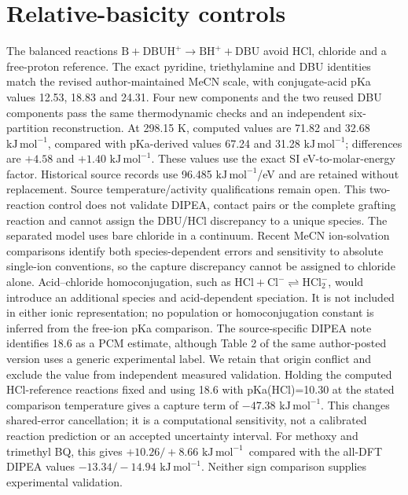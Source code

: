 \documentclass[11pt]{article}
\newcommand{\kj}{\ensuremath{\mathrm{kJ\,mol^{-1}}}}
\begin{document}
\section{Relative-basicity controls}
The balanced reactions $\mathrm{B+DBUH^+\rightarrow BH^++DBU}$ avoid HCl, chloride and a free-proton reference. The exact pyridine, triethylamine and DBU identities match the revised author-maintained MeCN scale, with conjugate-acid pKa values 12.53, 18.83 and 24.31.\cite{basicity2019,pkaTables} Four new components and the two reused DBU components pass the same thermodynamic checks and an independent six-partition reconstruction. At 298.15 K, computed values are 71.82 and 32.68 \kj, compared with pKa-derived values 67.24 and 31.28 \kj; differences are $+4.58$ and $+1.40$ \kj. These values use the exact SI eV-to-molar-energy factor. Historical source records use 96.485 \kj/eV and are retained without replacement. Source temperature/activity qualifications remain open. This two-reaction control does not validate DIPEA, contact pairs or the complete grafting reaction and cannot assign the DBU/HCl discrepancy to a unique species. The separated model uses bare chloride in a continuum. Recent MeCN ion-solvation comparisons identify both species-dependent errors and sensitivity to absolute single-ion conventions, so the capture discrepancy cannot be assigned to chloride alone.\cite{pliego2024} Acid--chloride homoconjugation, such as $\mathrm{HCl+Cl^-\rightleftharpoons HCl_2^-}$, would introduce an additional species and acid-dependent speciation. It is not included in either ionic representation; no population or homoconjugation constant is inferred from the free-ion pKa comparison.
The source-specific DIPEA note identifies 18.6 as a PCM estimate, although Table 2 of the same author-posted version uses a generic experimental label.\cite{heldebrant2011} We retain that origin conflict and exclude the value from independent measured validation. Holding the computed HCl-reference reactions fixed and using 18.6 with pKa(HCl)=10.30 at the stated comparison temperature gives a capture term of $-47.38$ \kj. This changes shared-error cancellation; it is a computational sensitivity, not a calibrated reaction prediction or an accepted uncertainty interval.
For methoxy and trimethyl BQ, this gives $+10.26/+8.66$ \kj\ compared with the all-DFT DIPEA values $-13.34/-14.94$ \kj. Neither sign comparison supplies experimental validation.
\end{document}
